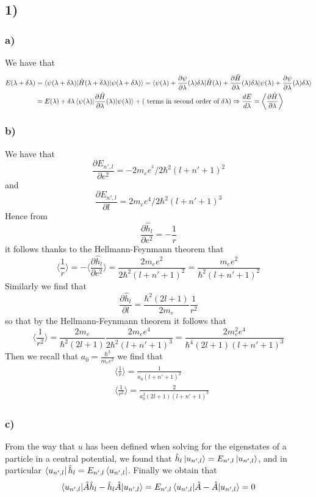 \documentclass[10pt,a4paper]{book}
\newcommand{\p}{\partial}
\begin{document}
\subsection*{1)}
\subsubsection*{a)}
We have that 
\begin{align*}
E(\lambda+\delta\lambda)&=\braket{\psi(\lambda+\delta\lambda)|\hat{H}(\lambda+\delta\lambda)|\psi(\lambda+\delta\lambda)}=\braket{\psi(\lambda)+\frac{\p\psi}{\p\lambda}(\lambda)\delta\lambda|\hat{H}(\lambda)+\frac{\p\hat{H}}{\p\lambda}(\lambda)\delta\lambda|\psi(\lambda)+\frac{\p\psi}{\p\lambda}(\lambda)\delta\lambda}\\
&=E(\lambda)+\delta\lambda\braket{\psi(\lambda)|\frac{\p\hat{H}}{\p\lambda}(\lambda)|\psi(\lambda)}+(\text{ terms in second order of }\delta\lambda)\Rightarrow \frac{dE}{d\lambda}=\bigg\langle\frac{\p\hat{H}}{\p\lambda}\bigg\rangle
\end{align*}

\subsubsection*{b)}
We have that
$$\frac{\p E_{n',l}}{\p e^2}=-2m_ee^{^2}/2\hbar^2(l+n'+1)^2$$
and 
$$\frac{\p E_{n',l}}{\p l}=2m_ee^4/2\hbar^2(l+n'+1)^3$$
Hence from
$$\frac{\p \hat{h}_l}{\p e^2}=-\frac{1}{r}
$$
it follows thanks to the Hellmann-Feynmann theorem that 
$$\bigg\langle \frac{1}{r}\bigg\rangle =-\bigg\langle \frac{\p \hat{h}_l}{\p e^2}\bigg\rangle =\frac{2m_ee^2}{2\hbar^2(l+n'+1)^2}=\frac{m_ee^2}{\hbar^2(l+n'+1)^2}$$ Similarly we find that 
$$\frac{\p\hat{h}_l}{\p l}=\frac{\hbar^2(2l+1)}{2m_e}\frac{1}{r^2}$$
so that by the Hellmann-Feynmann theorem it follows that 
$$\bigg\langle \frac{1}{r^2}\bigg\rangle = \frac{2m_e}{\hbar^2(2l+1)}\frac{2m_ee^4}{2\hbar^2(l+n'+1)^3}=\frac{2m_e^2e^4}{\hbar^4(2l+1)(l+n'+1)^3}$$
Then we recall that $a_0=\frac{\hbar^2}{m_ee^2}$ we find that
\begin{align*}
&\bigg\langle\frac{1}{r}\bigg\rangle
=\frac{1}{a_0(l+n'+1)^2}\\
&\bigg\langle \frac{1}{r^2}\bigg\rangle =\frac{2}{a_0^2(2l+1)(l+n'+1)^3}
\end{align*}

\subsubsection*{c)}
From the way that $u$ has been defined when solving for the eigenstates of a particle in a central potential, we found that $\hat{h}_l	\ket{u_{n',l}}=E_{n',l}\ket{u_{n',l}}$, and in particular $\bra{u_{n',l}}\hat{h}_l=E_{n',l}\bra{u_{n',l}}$. Finally we obtain that 
$$\braket{u_{n',l}|\hat{A}\hat{h}_l-\hat{h}_l\hat{A}|u_{n',l}}=E_{n',l}\braket{u_{n',l}|\hat{A}-\hat{A}|u_{n',l}}=0$$
\end{document}
